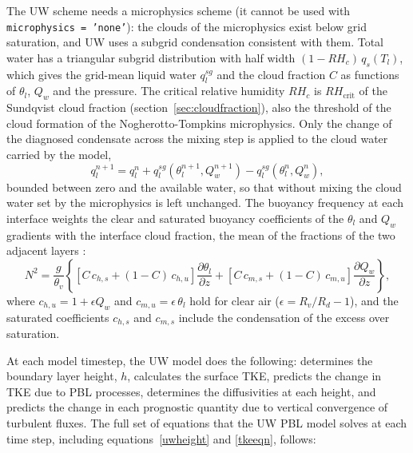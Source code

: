 The UW scheme needs a microphysics scheme (it cannot be used with
\texttt{microphysics = 'none'}): the clouds of the microphysics exist below
grid saturation, and UW uses a subgrid condensation consistent with them.  Total
water has a triangular subgrid distribution \citep{Smith_90} with half width
$(1-RH_c)\,q_s(T_l)$, which gives the grid-mean liquid water $q_l^{sg}$ and the
cloud fraction $C$ as functions of $\theta_l$, $Q_w$ and the pressure.  The
critical relative humidity $RH_c$ is $RH_\mathrm{crit}$ of the Sundqvist cloud
fraction (section~\ref{sec:cloudfraction}), also the threshold of the cloud
formation of the Nogherotto-Tompkins microphysics.  Only the change of the diagnosed condensate across the
mixing step is applied to the cloud water carried by the model,
\begin{equation}
  q_l^{n+1} = q_l^{n} + q_l^{sg}(\theta_l^{n+1},Q_w^{n+1}) -
              q_l^{sg}(\theta_l^{n},Q_w^{n}),
\end{equation}
bounded between zero and the available water, so that without mixing the
cloud water set by the microphysics is left unchanged.  The buoyancy frequency
at each interface weights the clear and saturated buoyancy coefficients of the
$\theta_l$ and $Q_w$ gradients with the interface cloud fraction, the mean of
the fractions of the two adjacent layers \citep{Bretherton_09}:
\begin{equation}
  N^2 = \frac{g}{\theta_v}\left\{\left[C\,c_{h,s}+(1-C)\,c_{h,u}\right]
        \frac{\partial \theta_l}{\partial z} +
        \left[C\,c_{m,s}+(1-C)\,c_{m,u}\right]
        \frac{\partial Q_w}{\partial z}\right\},
\end{equation}
where $c_{h,u} = 1+\epsilon Q_w$ and $c_{m,u} = \epsilon\,\theta_l$ hold for
clear air ($\epsilon = R_v/R_d - 1$), and the saturated coefficients $c_{h,s}$
and $c_{m,s}$ include the condensation of the excess over saturation.

At each model timestep, the UW model does the following: determines the
boundary layer height, $h$, calculates the surface TKE, predicts the change in
TKE due to PBL processes, determines the diffusivities at each height, and
predicts the change in each prognostic quantity due to vertical convergence of
turbulent fluxes.  The full set of equations that the UW PBL model solves at
each time step, including equations~\ref{uwheight} and \ref{tkeeqn}, follows:

